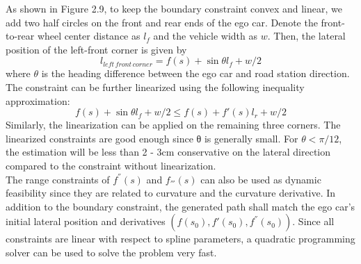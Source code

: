 \documentclass{thesisreport}
\begin{document}
\indent
As shown in Figure 2.9, to keep the boundary constraint convex and linear, we add two half circles on the front and rear ends of the ego car. Denote the front-to-rear wheel center distance as $l_f$ and the vehicle width as $w$. Then, the lateral position of the left-front corner is given by
\begin{equation}
	l_{left \, front \, corner} = f(s) + \sin \theta l_f +w/2
\end{equation}
where $\theta$ is the heading difference between the ego car and road station direction. The constraint can be further linearized using the following inequality
approximation:
\begin{equation}
 f(s) + \sin \theta l_f +w/2 \leq f(s)+ f'(s)l_r+w/2
\end{equation}
Similarly, the linearization can be applied on the remaining three corners. The linearized constraints are good enough since θ is generally small. For
$\theta < \pi/12$, the estimation will be less than 2 - 3cm conservative on the lateral direction compared to the constraint without linearization.\\
\indent
The range constraints of $f^{''}(s)$ and $f_{'''}(s)$ can also be used as dynamic feasibility since they are related to curvature and the curvature derivative. In addition to the boundary constraint, the generated path shall match the ego car’s initial lateral position and derivatives $(f(s_0), f'(s_0), f^{''}(s_0))$. Since all constraints are linear with respect to spline parameters, a quadratic programming solver can be used to solve the problem very fast.
\end{document}
